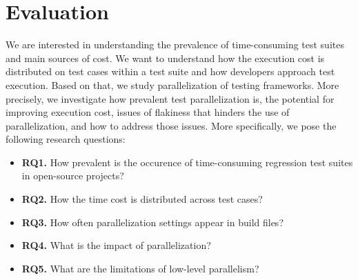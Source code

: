 \section{Evaluation}
\label{sec:eval}

We are interested in understanding the prevalence of time-consuming
test suites and main sources of cost. We want to understand how the
execution cost is distributed on test cases within a test suite and
how developers approach test execution. Based on that, we study
parallelization of testing frameworks.  More precisely, we investigate
how prevalent test parallelization is, the potential for improving
execution cost, issues of flakiness that hinders the use of
parallelization, and how to address those issues.  More specifically,
we pose the following research questions:

\newcommand{\numRQA}{RQ1}
\newcommand{\numRQB}{RQ2}
\newcommand{\numRQC}{RQ3}
\newcommand{\numRQD}{RQ4}
\newcommand{\numRQF}{RQ5}

\newcommand{\RQA}{How prevalent is the occurence of time-consuming
  regression test suites in open-source projects?}
\newcommand{\RQB}{How the time cost is distributed across test cases?}
\newcommand{\RQC}{How often parallelization settings appear in build
  files?}
\newcommand{\RQD}{What is the impact of parallelization?}
\newcommand{\RQF}{What are the limitations of low-level parallelism?}

\begin{itemize}
    \item \textbf{\numRQA.} \RQA
    \item \textbf{\numRQB.} \RQB
    \item \textbf{\numRQC.} \RQC
    \item \textbf{\numRQD.} \RQD
    \item \textbf{\numRQF.} \RQF
\end{itemize}


